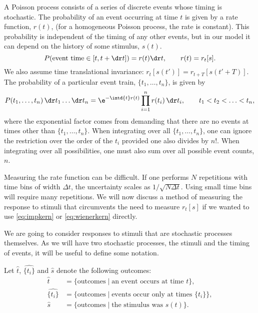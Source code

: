 \documentclass[12pt]{article}
\begin{document}
A Poisson process consists of a series of discrete events whose timing is stochastic.
The probability of an event occurring at time $t$ is given by a rate function, $r(t)$, (for a homogeneous Poisson process, the rate is constant).
This probability is independent of the timing of any other events, but in our model it can depend on the history of some stimulus, $s(t)$.
%
\begin{equation}\label{eq:poissonrate}
  P(\text{event time}\in[t,t+\dr t]) = r(t)\dr t,
  \qquad
  r(t) = r_t[s].
\end{equation}
%
We also assume time translational invariance: $r_t[s(t')] = r_{t+T}[s(t'+T)]$.
The probability of a particular event train, $\{t_1,\ldots,t_n\}$, is given by
%
\begin{equation}\label{eq:evtrain}
  P(t_1,\ldots,t_n)\,\dr t_1\ldots \dr t_n = \e^{-\intd{t}r(t)} \prod_{i=1}^n r(t_i)\,\dr t_i, \qquad t_1<t_2<\ldots<t_n,
\end{equation}
%
where the exponential factor comes from demanding that there are no events at times other than $\{t_1,\ldots,t_n\}$.
When integrating over all $\{t_1,\ldots,t_n\}$, one can ignore the restriction over the order of the $t_i$ provided one also divides by $n!$.
When integrating over all possibilities, one must also sum over all possible event counts, $n$.

Measuring the rate function can be difficult.
If one performs $N$ repetitions with time bins of width $\Delta t$, the uncertainty scales as $1/\sqrt{N\Delta t}$.
Using small time bins will require many repetitions.
We will now discuss a method of measuring the response to stimuli that circumvents the need to measure $r_t[s]$ if we wanted to use \eqref{eq:impkern} or \eqref{eq:wienerkern} directly.

We are going to consider responses to stimuli that are stochastic processes themselves.
As we will have two stochastic processes, the stimuli and the timing of events, it will be useful to define some notation.

\begin{notn}[outcomes]
  Let $\hat{t}$, $\widehat{\{t_i\}}$ and $\hat{s}$ denote the following outcomes:
  \begin{equation}\label{eq:outcomes}
    \begin{aligned}
      \hat{t} &= \{ \text{outcomes} \mid \text{an event occurs at time } t  \} , \\
      \widehat{\{t_i\}} &= \{ \text{outcomes} \mid \text{events occur only at times } \{t_i\}  \} , \\
      \hat{s} &= \{ \text{outcomes} \mid \text{the stimulus was } s(t)  \} .
    \end{aligned}
  \end{equation}
\end{notn}
\end{document}
